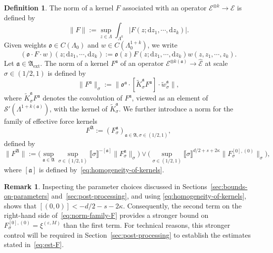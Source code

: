 \documentclass{article}
\numberwithin{equation}{section}
\newcommand{\assign}{:=}
\newcommand{\mathd}{\mathrm{d}}
\theoremstyle{plain}
\theoremstyle{definition}
\newtheorem{definition}[theorem]{Definition}
\newtheorem{remark}[theorem]{Remark}
\begin{document}
\begin{definition}
  \label{def:norm-kernels}The norm of a kernel $F$ associated with an operator
  $\mathcal{E}^{\otimes k} \rightarrow \mathcal{E}$ is defined by
  \begin{equation}
    \| F \| \assign \sup_{z \in \Lambda} \int_{\Lambda^k} | F (z ; \mathd z_1,
    \cdots, \mathd z_k) | . \label{eq:basic-norm}
  \end{equation}
  Given weights $\mathfrak{o} \in C (\Lambda_0)$ and $w \in C (\Lambda_0^{1 +
  k})$, we write
  \[ (\mathfrak{o} \cdot  F \cdot w) (z ; \mathd z_1, \cdots,
     \mathd z_k) \assign \mathfrak{o} (z) F (z ; \mathd z_1, \cdots, \mathd
     z_k) w (z, z_1, \cdots, z_k) . \]
  Let $\mathfrak{a} \in \mathfrak{A}_{\mathrm{ext}}$. The norm of a kernel
  $F^{\mathfrak{a}}$
  of an operator $\mathcal{E}^{\otimes k (\mathfrak{a})} \rightarrow
  \hat{\mathcal{E}}$ at scale $\sigma \in (1 / 2, 1)$ is defined by
  \[ \| F^{\mathfrak{a}} \|_{\sigma} \assign \| \mathfrak{o}^{\mathfrak{a}}
     \cdot [\tilde{K}^{\mathfrak{a}}_{\sigma} F^{\mathfrak{a}}] \cdot
     \tilde{w}^{\mathfrak{a}}_{\sigma} \|, \]
  where $\tilde{K}^{\mathfrak{a}}_{\sigma} F^{\mathfrak{a}}$ denotes the
  convolution of $F^{\mathfrak{a}}$, viewed as an element of $\mathcal{S}'
  (\Lambda^{1 + k (\mathfrak{a})})$, with the kernel of
  $\tilde{K}^{\mathfrak{a}}_{\sigma}$. We further introduce a norm for the
  family of effective force kernels
  \[ F^{\mathfrak{A}} \assign (F^{\mathfrak{a}}_{\sigma})_{\mathfrak{a} \in
     \mathfrak{A}, \sigma \in (1 / 2, 1)}, \]
  defined by
  \begin{equation}
    \| F^{\mathfrak{A}} \| \assign \bigg(\sup_{\mathfrak{a} \in \mathfrak{A}}
    \sup_{\sigma \in (1 / 2, 1)}  \llbracket \sigma \rrbracket^{-
    [\mathfrak{a}]}  \| F^{\mathfrak{a}}_{\sigma} \|_{\sigma}\bigg) 
    \vee
    \bigg(\sup_{\sigma \in (1 / 2, 1)}  \llbracket \sigma \rrbracket^{d / 2 + s + 2
    \kappa}  \| F^{[0], (0)}_{\sigma} \|_{\sigma}\bigg), \label{eq:norm-family-F}
  \end{equation}
  where $[\mathfrak{a}]$ is defined by~\eqref{eq:homogeneity-of-kernels}.
\end{definition}

\begin{remark}
  Inspecting the parameter choices discussed in
  Sections~\ref{sec:bounds-on-parameters} and~\ref{sec:post-processing}, and using
  \eqref{eq:homogeneity-of-kernels}, shows that $[(0, 0)] < - d / 2 - s -
  2 \kappa$. Consequently, the second term on the right-hand side
  of~\eqref{eq:norm-family-F} provides a stronger bound on $F^{[0],
  (0)}_{\sigma} = \xi^{(\varepsilon, M)}$ than the first term. For technical
  reasons, this stronger control will be required in
  Section~\ref{sec:post-processing} to establish the estimates stated
  in~\eqref{eq:est-F}.
\end{remark}
\end{document}
